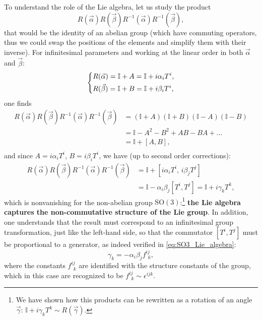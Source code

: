 To understand the role of the Lie algebra, let us study the product
\[
    R(\vec{\alpha}) R(\vec{\beta}) R^{-1}(\vec{\alpha}) R^{-1}(\vec{\beta}),
\]
that would be the identity of an abelian group (which have commuting operators, thus we could swap the positions of the elements and simplify them with their inverse). For infinitesimal parameters and working at the linear order in both $\vec{\alpha}$ and $\vec{\beta}$:
\[
    \begin{dcases}
        R(\vec{\alpha}) = \mathbb{I} + A = \mathbb{I} + i \alpha_i T^i, \\
        R(\vec{\beta}) = \mathbb{I} + B = \mathbb{I} + i \beta_i T^i,
    \end{dcases}
\]
one finds
\[
    \begin{aligned}
        R(\vec{\alpha}) R(\vec{\beta}) R^{-1}(\vec{\alpha}) R^{-1}(\vec{\beta}) & = (\mathbb{I} + A)(\mathbb{I} + B)(\mathbb{I} - A)(\mathbb{I} - B) \\
                                                                                & = \mathbb{I} - A^2 - B^2 + AB - BA + \dots                         \\
                                                                                & = \mathbb{I} + [A, B],                                             \\
    \end{aligned}
\]
and since \(A = i \alpha_i T^i\), \(B = i \beta_i T^i\), we have (up to second order corrections):
\[
    \begin{aligned}
        R(\vec{\alpha}) R(\vec{\beta}) R^{-1}(\vec{\alpha}) R^{-1}(\vec{\beta}) & = \mathbb{I} + \left[i \alpha_i T^i,\, i \beta_j T^j \right]              \\
                                                                                & = \mathbb{I} - \alpha_i \beta_j [T^i, T^j] = \mathbb{I} + i \gamma_k T^k,
    \end{aligned}
\]
which is nonvanishing for the non-abelian group $\mathrm{SO}(3)$:\footnote{We have shown how this products can be rewritten as a rotation of an angle \(\vec{\gamma}\): \(\mathbb{I} + i \gamma_k T^k \sim R(\vec{\gamma})\).} \textbf{the Lie algebra captures the non-commutative structure of the Lie group}. In addition, one understands that the result must correspond to an infinitesimal group transformation, just like the left-hand side, so that the commutator $[T^i, T^j]$ must be proportional to a generator, as indeed verified in \eqref{eq:SO3_Lie_algebra}:
\[
    \gamma_k = - \alpha_i \beta_j f^{ij}_{\ \ k},
\]
where the constants \(f^{ij}_{\ \ k}\) are identified with the structure constants of the group, which in this case are recognized to be \(f^{ij}_{\ \ k} \sim \epsilon^{ijk}\).

